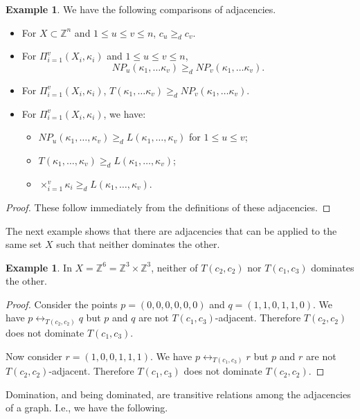 \documentclass{article}
\theoremstyle{plain}
\theoremstyle{definition}
\newtheorem{exl}[thm]{Example}
\numberwithin{thm}{section}
\newcommand{\adj}{\leftrightarrow}
\def\Z{{\mathbb Z}}
\begin{document}
\begin{exl}
We have the following comparisons of adjacencies.
\begin{itemize}
\item For $X \subset \Z^n$ and $1 \le u \le v \le n$,
$c_u \ge_d c_v$.
\item For $\Pi_{i=1}^v (X_i,\kappa_i)$ and $1 \le u \le v \le n$,
\[NP_u(\kappa_1,\ldots \kappa_v) \ge_d NP_v(\kappa_1,\ldots \kappa_v).
\]
\item For $\Pi_{i=1}^v (X_i,\kappa_i)$,
$T(\kappa_1,\ldots \kappa_v) \ge_d NP_v(\kappa_1,\ldots \kappa_v)$.
\item For $\Pi_{i=1}^v (X_i,\kappa_i)$, we have:
\begin{itemize}
\item $NP_u(\kappa_1,\ldots,\kappa_v) \ge_d L(\kappa_1,\ldots,\kappa_v)$ for $1 \le u \le v$;
\item $T(\kappa_1,\ldots,\kappa_v) \ge_d L(\kappa_1,\ldots,\kappa_v)$;
\item $\times_{i=1}^v \kappa_i \ge_d L(\kappa_1,\ldots,\kappa_v)$.
\end{itemize}
\end{itemize}
\end{exl}

\begin{proof} These follow
immediately from the
definitions of these adjacencies.
\end{proof}

The next example shows that
there are adjacencies that can
be applied to the same set $X$ such that neither dominates the other.

\begin{exl}
\label{neither-dominates}
In $X=\Z^6 = \Z^3 \times \Z^3$,
neither of $T(c_2,c_2)$ nor
$T(c_1,c_3)$ dominates the other.
\end{exl}

\begin{proof}
Consider the points
$p=(0,0,0,0,0,0)$ and
$q=(1,1,0,1,1,0)$. We have
$p \adj_{T(c_2,c_2)} q$ but
$p$ and $q$ are not $T(c_1,c_3)$-adjacent. Therefore
$T(c_2,c_2)$ does not dominate
$T(c_1,c_3)$.

Now consider $r=(1,0,0,1,1,1)$.
We have $p \adj_{T(c_1,c_3)} r$
but $p$ and $r$ are not
$T(c_2,c_2)$-adjacent. Therefore
$T(c_1,c_3)$ does not dominate
$T(c_2,c_2)$.
\end{proof}

Domination, and being dominated,
are transitive relations among
the adjacencies of a graph. I.e., we have the following.
\end{document}
